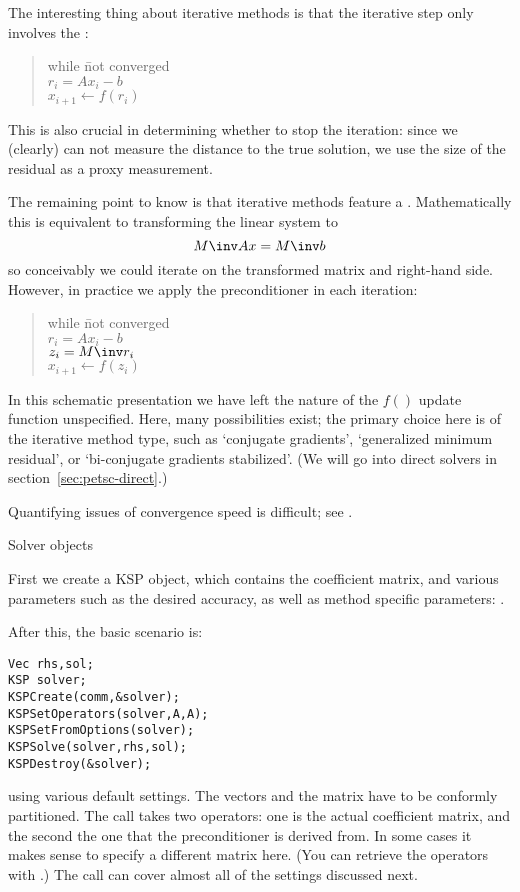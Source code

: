 The interesting thing about iterative methods is that the iterative step
only involves the :

\begin{quote}
  \begin{tabbing}
    while \=not converged\\
    \> $r_i = Ax_i-b$\\
    \> $x_{i+1}\leftarrow f(r_i)$
  \end{tabbing}
\end{quote}

This  is also crucial in determining whether to stop the iteration:
since we (clearly) can not measure the distance to the true solution, we use
the size of the residual as a proxy measurement.

The remaining point to know is that iterative methods feature a .
Mathematically this is equivalent to transforming the linear system to
\[ M\inv Ax=M\inv b \]
so conceivably we could iterate on the transformed matrix and right-hand side.
However, in practice we apply the preconditioner in each iteration:

\begin{quote}
  \begin{tabbing}
    while \=not converged\\
    \> $r_i = Ax_i-b$\\
    \> $z_i = M\inv r_i$\\
    \> $x_{i+1}\leftarrow f(z_i)$
  \end{tabbing}
\end{quote}

In this schematic presentation we have left the nature of the $f()$ update
function unspecified. Here, many possibilities exist; the primary
choice here is of the iterative method type, such as `conjugate gradients',
`generalized minimum residual', or `bi-conjugate gradients stabilized'.
(We will go into direct solvers in section~\ref{sec:petsc-direct}.)

Quantifying issues of convergence speed is difficult;
see .

 {Solver objects}

First we create a KSP object, which contains the coefficient matrix,
and various parameters such as the desired accuracy,
as well as method specific parameters:
%
.

After this, the basic scenario is:
\begin{lstlisting}
Vec rhs,sol;
KSP solver;
KSPCreate(comm,&solver);
KSPSetOperators(solver,A,A);
KSPSetFromOptions(solver);
KSPSolve(solver,rhs,sol);
KSPDestroy(&solver);
\end{lstlisting}
using various default settings. The vectors and the matrix have to be
conformly partitioned.
The  call
takes two operators: one is the actual coefficient matrix, and the second
the one that the preconditioner is derived from.
In some cases it makes sense
to specify a different matrix here.
(You can retrieve the operators with .)
The call  can cover almost all of the
settings discussed next.

